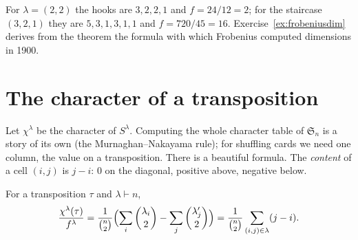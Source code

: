 For $\lambda=(2,2)$ the hooks are $3,2,2,1$ and $f=24/12=2$; for the staircase $(3,2,1)$ they are $5,3,1,3,1,1$ and $f=720/45=16$. Exercise~\ref{ex:frobeniusdim} derives from the theorem the formula with which Frobenius computed dimensions in 1900.

\section{The character of a transposition}

Let $\chi^\lambda$ be the character of $S^\lambda$. Computing the whole character table of $\mathfrak S_n$ is a story of its own (the Murnaghan--Nakayama rule); for shuffling cards we need one column, the value on a transposition. There is a beautiful formula.
The \emph{content} of a cell $(i,j)$ is $j-i$: $0$ on the diagonal, positive above, negative below.

\begin{theorem}[Frobenius, 1900]\label{thm:transposition}
For a transposition $\tau$ and $\lambda\vdash n$,
\[
\frac{\chi^\lambda(\tau)}{f^\lambda}=\frac1{\binom n2}\Bigl(\sum_i\binom{\lambda_i}2-\sum_j\binom{\lambda'_j}2\Bigr)=\frac1{\binom n2}\sum_{(i,j)\in\lambda}(j-i).
\]
\end{theorem}

